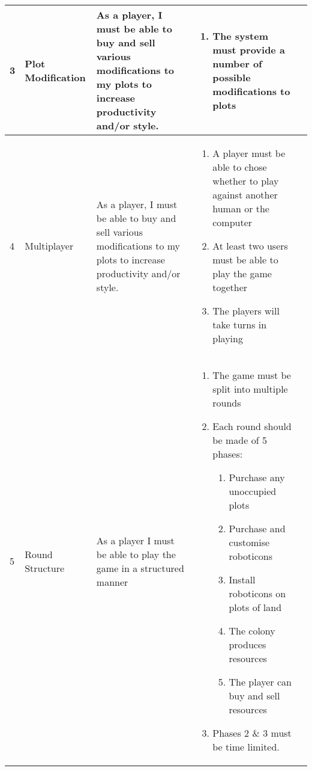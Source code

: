 \begin{landscape}
\begin{longtable}{|l||l|p{4cm}|p{8cm}|p{7cm}|}
	3 & Plot Modification
	& As a player, I must be able to buy and sell various modifications to my plots to increase productivity and/or style.
	& \begin{enumerate}[label=3.1.\arabic*.]
		\item The system must provide a number of possible modifications to plots
	\end{enumerate} & \\ \hline

	4 & Multiplayer
	& As a player, I must be able to buy and sell various modifications to my plots to increase productivity and/or style.
	& \begin{enumerate}[label=4.1.\arabic*.]
		\item A player must be able to chose whether to play against another human or the computer
		\item At least two users must be able to play the game together
		\item The players will take turns in playing
	\end{enumerate} & \\ \hline

	5 & Round Structure
	& As a player I must be able to play the game in a structured manner
	& \begin{enumerate}[label=5.1.\arabic*.]
		\item The game must be split into multiple rounds
		\item Each round should be made of 5 phases:
		\begin{enumerate}[label=\arabic*.]
			\item Purchase any unoccupied plots
			\item Purchase and customise roboticons
			\item Install roboticons on plots of land
			\item The colony produces resources
			\item The player can buy and sell resources
		\end{enumerate}
		\item Phases 2 \& 3 must be time limited. 
	\end{enumerate} & \\ \hline


\end{longtable}
\end{landscape}
